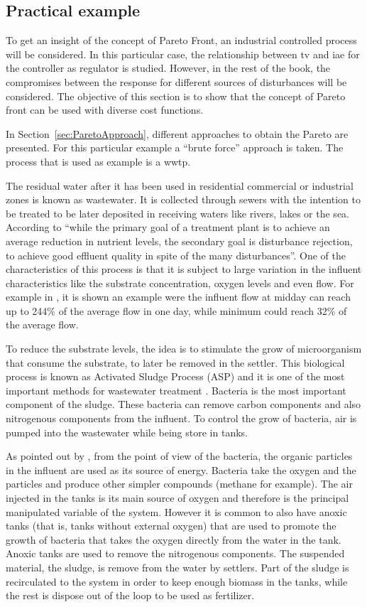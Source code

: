 \subsection{Practical example}
\label{sec:ParetoPractical}
To get an insight of the concept of Pareto Front, an industrial controlled process will be considered. In this particular case, the relationship between \gls{tv} and \gls{iae} for the controller as regulator is studied. However, in the rest of the book, the compromises between the response for different sources of disturbances will be considered. The objective of this section is to show that the concept of Pareto front can be used with diverse cost functions.

In Section~\ref{sec:ParetoApproach}, different approaches to obtain the Pareto are presented. For this particular example a ``brute force'' approach is taken. The process that is used as example is a \gls{wwtp}.

The residual water after it has been used in residential commercial or industrial zones is known as wastewater. It is collected through sewers with the intention to be treated to be later deposited in receiving waters like rivers, lakes or the sea. According to \citet{Olsson1999} ``while the primary goal of a treatment plant is to achieve an average reduction in nutrient levels, the secondary goal is disturbance rejection, to achieve good effluent quality in spite of the many disturbances''. One of the characteristics of this process is that it is subject to large variation in the influent characteristics like the substrate concentration, oxygen levels and even flow. For example in \citet{Henze1997}, it is shown an example were the influent flow at midday can reach up to 244\% of the average flow in one day, while minimum could reach 32\% of the average flow.

To reduce the substrate levels, the idea is to stimulate the grow of microorganism that consume the substrate, to later be removed in the settler. This biological process is known as Activated Sludge Process (ASP) and it is one of the most important methods for wastewater treatment \citep{Henze1997}. Bacteria is the most important component of the sludge. These bacteria can remove carbon components and also nitrogenous components from the influent. To control the grow of bacteria, air is pumped into the wastewater while being store in tanks.

As pointed out by \citet{Jeppsson1996}, from the point of view of the bacteria, the organic particles in the influent are used as its source of energy. Bacteria take the oxygen and the particles and produce other simpler compounds (methane for example). The air injected in the tanks is its main source of oxygen and therefore is the principal manipulated variable of the system. However it is common to also have anoxic tanks (that is, tanks without external oxygen) that are used to promote the growth of bacteria that takes the oxygen directly from the water in the tank. Anoxic tanks are used to remove the nitrogenous components. The suspended material, the sludge, is remove from the water by settlers. Part of the sludge is recirculated to the system in order to keep enough biomass in the tanks, while the rest is dispose out of the loop to be used as fertilizer.

